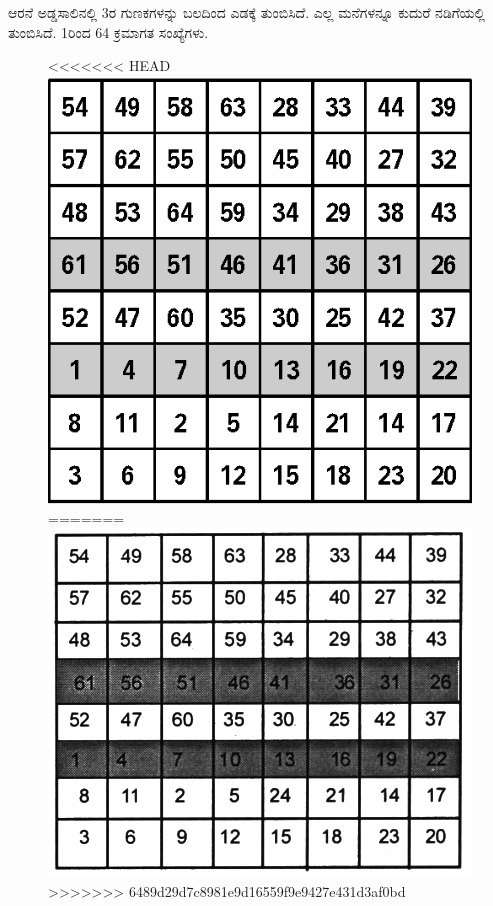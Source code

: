 ಆರನೆ ಅಡ್ಡಸಾಲಿನಲ್ಲಿ 3ರ ಗುಣಕಗಳನ್ನು ಬಲದಿಂದ ಎಡಕ್ಕೆ ತುಂಬಿಸಿದೆ. ಎಲ್ಲ ಮನೆ\-ಗಳನ್ನೂ ಕುದುರೆ ನಡಿಗೆಯಲ್ಲಿ ತುಂಬಿಸಿದೆ. 1ರಿಂದ 64 ಕ್ರಮಾಗತ ಸಂಖ್ಯೆಗಳು.
\begin{figure}[H]
<<<<<<< HEAD
\includegraphics{src/figures/chap6/fig6-16.eps}
=======
\includegraphics[scale=0.85]{src/figures/chap6/fig6.16.jpg}
>>>>>>> 6489d29d7c8981e9d16559f9e9427e431d3af0bd
\end{figure}
